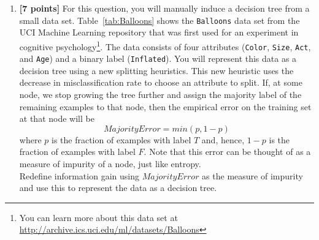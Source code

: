 \begin{enumerate}
\begin{enumerate}
  \item \textbf{[7 points]} For this question, you will manually induce a decision tree from a
  small data set. Table~\ref{tab:Balloons} shows the {\tt Balloons}
  data set from the UCI Machine Learning repository that was first used
  for an experiment in cognitive psychology\footnote{You can learn more about
    this data set at
    \url{http://archive.ics.uci.edu/ml/datasets/Balloons}}.  The data
  consists of four attributes (\texttt{Color}, \texttt{Size}, \texttt{Act}, and
  \texttt{Age}) and a binary label (\texttt{Inflated}). You will represent this data as a decision tree using a new splitting
heuristics. This new heuristic uses the decrease in misclassification rate to choose
an attribute to split. If, at some node, we stop growing the tree further and assign
the majority label of the remaining examples to that node, then the empirical error
on the training set at that node will be
  \[ MajorityError = min(p, 1-p) \]
    where $p$ is the fraction of examples with label $T$ and, hence, 
  $1-p$ is the fraction of examples with label $F$. Note that this
    error can be thought of as a measure of impurity of a node, just
    like entropy.\\
    Redefine information gain using $MajorityError$ as the measure of
    impurity and use this to represent the data as a decision tree.
    

\end{enumerate}
\end{enumerate}
